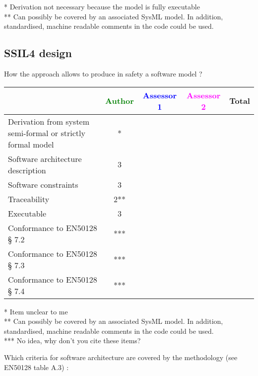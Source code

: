 \begin{author_comment}
* Derivation not necessary because the model is fully executable\\
** Can possibly be covered by an associated SysML model. In addition, standardised, machine readable comments in the code could be used.\\
\end{author_comment}

\subsection{SSIL4 design}

How the approach allows to produce in safety a software model ?

\begin{tabular}{|l | c | c | c | c|}
\hline
& \textcolor{green}{Author} & \textcolor{blue}{Assessor 1} & \textcolor{magenta}{Assessor 2} & Total \\
\hline
Derivation from system semi-formal or strictly formal model &* & & & \\
\hline
Software architecture description &3 & & & \\
\hline
Software constraints &3 & & & \\
\hline
Traceability &2** & & & \\
\hline
Executable &3 & & & \\
\hline
Conformance to EN50128 § 7.2 &*** & & & \\
\hline
Conformance to EN50128 § 7.3 &*** & & & \\
\hline
Conformance to EN50128 § 7.4 &*** & & & \\
\hline
\end{tabular}

\begin{author_comment}
* Item unclear to me\\
** Can possibly be covered by an associated SysML model. In addition, standardised, machine readable comments in the code could be used.\\
*** No idea, why don't you cite these items?
\end{author_comment}

Which criteria for software architecture are covered by the methodology
(see EN50128 table A.3) :

